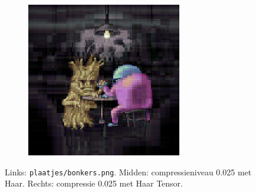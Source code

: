 \begin{figure}
\begin{subfigure}[t]{0.32\textwidth}
	\end{subfigure}
	\begin{subfigure}[t]{0.32\textwidth}
	\includegraphics[width=\linewidth]{plaatjes/bonkers_haar_t_0_025.png}
	\end{subfigure}
	\caption{Links: \texttt{plaatjes/bonkers.png}. Midden: compressieniveau 0.025 met Haar. Rechts: compressie 0.025 met Haar Tensor.}
	\label{fig:tensor_end}
\end{figure}
\restoregeometry
\pagebreak
